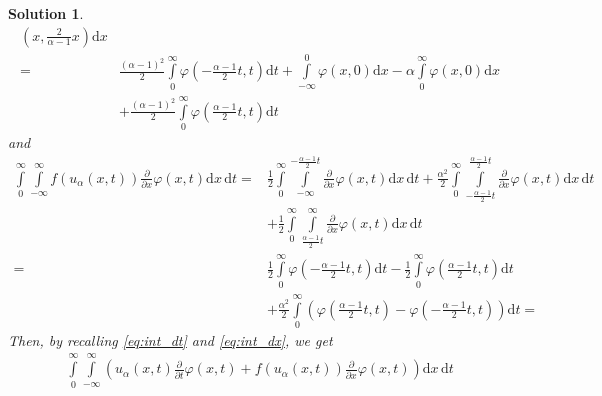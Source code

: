 \documentclass[10pt,letterpaper]{article}
\theoremstyle{break}
\newtheorem{solution}{Solution}
\begin{document}
\begin{solution}
\begin{equation}
\begin{aligned}
		\left(x,\frac{2}{\alpha-1}x\right)
		\text{d}x
		\\
		=
		&
		\frac{(\alpha-1)^2}{2}
		\int\limits_{0}^{\infty}
		\varphi
		\left(-\frac{\alpha-1}{2}t,t\right)
		\text{d}t
		+
		\int\limits_{-\infty}^{0}
		\varphi
		\left(x,0\right)
		\text{d}x
		-\alpha
		\int\limits_{0}^{\infty}
		\varphi
		\left(x,0\right)
		\text{d}x \\
		&
		+
		\frac{(\alpha-1)^2}{2}
		\int\limits_{0}^{\infty}
		\varphi
		\left(\frac{\alpha-1}{2}t,t\right)
		\text{d}t
	\end{aligned}
	\end{equation}
	and
	\begin{equation}\label{eq:int_dx}
	\begin{aligned}
		\int\limits_{0}^{\infty}
		\int\limits_{-\infty}^{\infty}
		f(u_\alpha(x,t))
		\frac{\partial}{\partial x} \varphi(x,t)
		\text{d}x\, \text{d}t
		=
		&
		\frac{1}{2}
		\int\limits_{0}^{\infty}
		\int\limits_{-\infty}^{-\frac{\alpha-1}{2}t}
		\frac{\partial}{\partial x} \varphi(x,t)
		\text{d}x\, \text{d}t
		+
		\frac{\alpha^2}{2}
		\int\limits_{0}^{\infty}
		\int\limits_{-\frac{\alpha-1}{2}t}^{\frac{\alpha-1}{2}t}
		\frac{\partial}{\partial x} \varphi(x,t)
		\text{d}x\, \text{d}t \\
		&
		+
		\frac{1}{2}
		\int\limits_{0}^{\infty}
		\int\limits_{\frac{\alpha-1}{2}t}^{\infty}
		\frac{\partial}{\partial x} \varphi(x,t)
		\text{d}x\, \text{d}t \\
		=
		&
		\frac{1}{2}
		\int\limits_{0}^{\infty}
		\varphi
		\left(
			-\frac{\alpha-1}{2}t,t
		\right)
		\text{d}t
		-
		\frac{1}{2}
		\int\limits_{0}^{\infty}
		\varphi
			\left(
				\frac{\alpha-1}{2}t,t
			\right)
		\text{d}t \\
		&
		+
		\frac{\alpha^2}{2}
		\int\limits_{0}^{\infty}
		\left(
			\varphi
			\left(
				\frac{\alpha-1}{2}t,t
			\right)
			-
			\varphi
			\left(
				-\frac{\alpha-1}{2}t,t
			\right)
		\right)
		\text{d}t
		=
	\end{aligned}
	\end{equation}
	Then, by recalling \eqref{eq:int_dt} and \eqref{eq:int_dx}, we get
	\begin{align}
		\int\limits_{0}^{\infty}
		\int\limits_{-\infty}^{\infty}
		\left(
			u_\alpha(x,t)
			\frac{\partial}{\partial t} \varphi(x,t)
			+
			f(u_\alpha(x,t))
			\frac{\partial}{\partial x} \varphi(x,t)
		\right)
		\text{d}x\, \text{d}t
	\end{align}
\end{solution}
\end{document}
